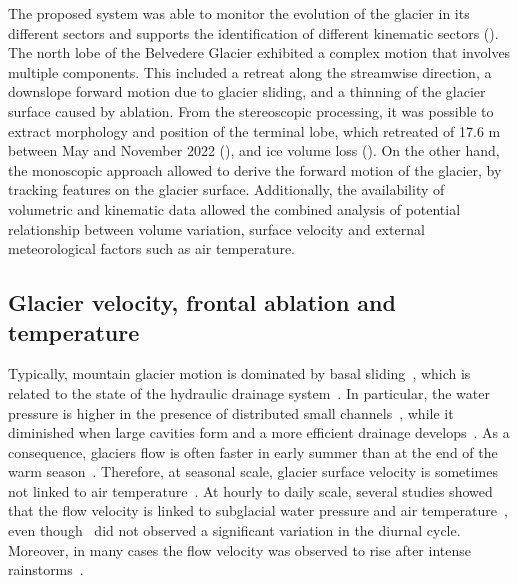 The proposed system was able to monitor the evolution of the glacier in its different
sectors and supports the identification of different kinematic sectors
().
The north lobe of the Belvedere Glacier exhibited a complex motion that involves multiple
components.
This included a retreat along the streamwise direction, a downslope forward motion due to
glacier sliding, and a thinning of the glacier surface caused by ablation.
From the stereoscopic processing, it was possible to extract morphology and position of
the terminal lobe, which retreated of 17.6 m between May and November 2022
(), and ice volume loss ().
On the other hand, the monoscopic approach allowed to derive the forward motion of the
glacier, by tracking features on the glacier surface.
Additionally, the availability of volumetric and kinematic data allowed
the combined analysis of potential relationship between volume variation, surface
velocity and external meteorological factors such as air temperature.

\subsection{Glacier velocity, frontal ablation and
  temperature}\label{sec:4:discuss_velocity_ablation_temperature}

Typically, mountain glacier motion is dominated by basal sliding~\citep{willis1995intra},
which is related to the state of the hydraulic drainage
system~\citep{vincent2016sliding}.
In particular, the water pressure is higher in the presence of distributed small
channels~\citep{pimentel2011numerical}, while it diminished when large cavities form and
a more
efficient drainage develops~\citep{nienow2005hydrological}.
As a consequence, glaciers flow is often faster in early summer than at the end of the
warm season~\citep{sanders2018variations,vincent2016sliding}.
Therefore, at seasonal scale, glacier surface velocity is sometimes not linked to air
temperature~\citep{sanders2018variations}.
At hourly to daily scale, several studies showed that the flow velocity is linked to
subglacial water pressure \citep{sugiyama2010surface} and air
temperature~\citep{liu2019diurnal},
even though~\citet{allstadt2015observations} did not observed a significant variation in
the diurnal cycle.
Moreover, in many cases the flow velocity was observed to rise after intense
rainstorms~\citep{benoit2015multi,horgan2015glacier,sugiyama2010surface}.

